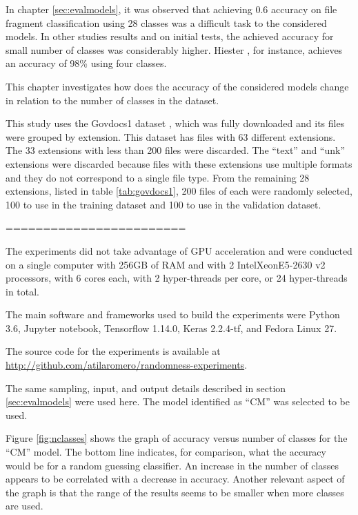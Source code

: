 In chapter \ref{sec:evalmodels}, it was observed that achieving 0.6 accuracy on file fragment classification using 28 classes was a difficult task to the considered models. In other studies results \cite{hiester_file_2018} \cite{sportiello_context-based_2012} \cite{amirani_feature-based_2013} \cite{maslim_distributed_2014} and on initial tests, the achieved accuracy for small number of classes was considerably higher. Hiester \cite{hiester_file_2018}, for instance, achieves an accuracy of 98\% using four classes.

This chapter investigates how does the accuracy of the considered models change in relation to the number of classes in the dataset.


This study uses the Govdocs1 dataset \cite{garfinkel_bringing_2009}, which was fully downloaded and its files were grouped by extension. This dataset has files with 63 different extensions. The 33 extensions with less than 200 files were discarded. The  ``text'' and ``unk'' extensions were discarded because files with these extensions use multiple formats and they do not correspond to a single file type. From the remaining 28 extensions, listed in table \ref{tab:govdocs1}, 200 files of each were randomly selected, 100 to use in the training dataset and 100 to use in the validation dataset.

% 

========================

The experiments did not take advantage of GPU acceleration and were  conducted on a single computer with 256GB of RAM and with 2 Intel\textregistered Xeon\textregistered E5-2630 v2 processors, with 6 cores each, with 2 hyper-threads per core, or 24 hyper-threads in total. 


The main software and frameworks used to build the experiments were Python 3.6, Jupyter notebook, Tensorflow 1.14.0, Keras 2.2.4-tf, and Fedora Linux 27.

The source code for the experiments is available at \sloppy\url{http://github.com/atilaromero/randomness-experiments}.

The same sampling, input, and output details described in section \ref{sec:evalmodels} were used here. The model identified as ``CM'' was selected to be used.

Figure \ref{fig:nclasses} shows the graph of accuracy versus number of classes for the ``CM'' model. The bottom line indicates, for comparison, what the accuracy would be for a random guessing classifier. An increase in the number of classes appears to be  correlated with a decrease in accuracy. Another relevant aspect of the graph is that the range of the results seems to be smaller when more classes are used.  

